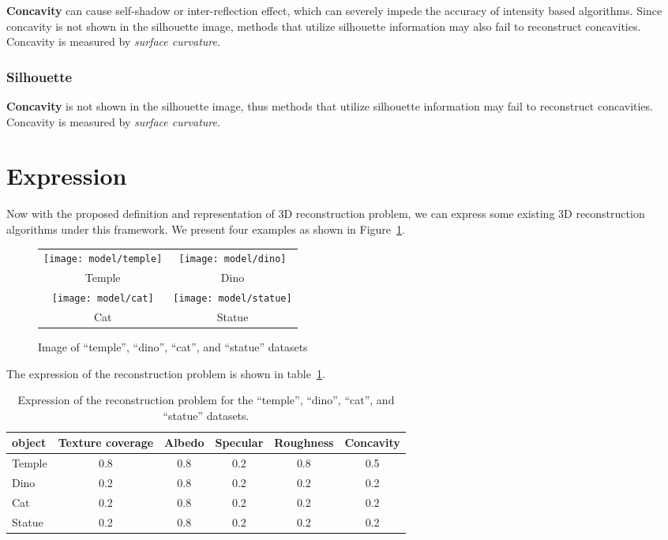
\textbf{Concavity} can cause self-shadow or inter-reflection effect, which can severely impede the accuracy of intensity based algorithms. Since concavity is not shown in the silhouette image, methods that utilize silhouette information may also fail to reconstruct concavities. Concavity is measured by \textit{surface curvature}.

\subsubsection{Silhouette}
\textbf{Concavity} is not shown in the silhouette image, thus methods that utilize silhouette information may fail to reconstruct concavities. Concavity is measured by \textit{surface curvature}.

\section{Expression}
\label{sec:3DRecon_Exp}
Now with the proposed definition and representation of 3D reconstruction problem, we can express some existing 3D reconstruction algorithms under this framework. We present four examples as shown in Figure~\ref{fig:express}.
\begin{figure}[h]
\centering
\begin{tabular}{cc}
\texttt{[image: model/temple]}&
\texttt{[image: model/dino]}\\
Temple & Dino\\
\texttt{[image: model/cat]}&
\texttt{[image: model/statue]}\\
Cat & Statue\\
\end{tabular}
\caption{Image of ``temple'', ``dino'', ``cat'', and ``statue'' datasets}
\label{fig:express}
\end{figure}

The expression of the reconstruction problem is shown in table~\ref{tab:express}.
\begin{table}[h]
  \centering
  \begin{tabular}{l*{5}{c}}
  \hline
  \textbf{object} & Texture coverage & Albedo & Specular & Roughness & Concavity\\
  \hline
  Temple & 0.8 & 0.8 & 0.2 & 0.8 & 0.5\\
  Dino & 0.2 & 0.8 & 0.2 & 0.2 & 0.2\\
  Cat & 0.2 & 0.8 & 0.2 & 0.2 & 0.2\\
  Statue & 0.2 & 0.8 & 0.2 & 0.2 & 0.2\\
  \hline
  \end{tabular}
  \label{tab:express}
  \caption{Expression of the reconstruction problem for the ``temple'', ``dino'', ``cat'', and ``statue'' datasets.}
\end{table}